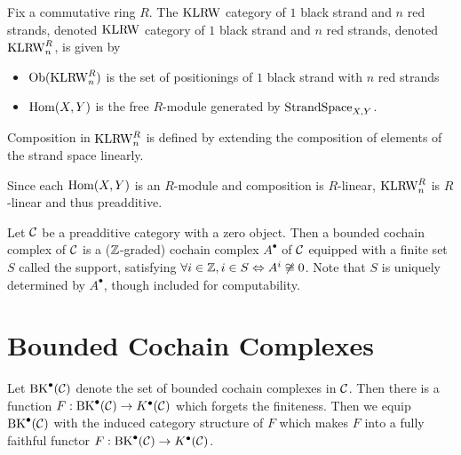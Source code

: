 \begin{definition}
  Fix a commutative ring $R$. The $\operatorname{KLRW}$ category of $1$ black strand
  and $n$ red strands, denoted $\operatorname{KLRW}$ category of $1$ black strand
  and $n$ red strands, denoted $\operatorname{KLRW}^R_n$, is given by
  \begin{itemize}
    \item $\operatorname{Ob}(\operatorname{KLRW}^R_n)$ is the set of positionings of $1$ black strand
    with $n$ red strands
    \item $\operatorname{Hom}(X, Y)$ is the free $R$-module generated by $\text{StrandSpace}_{X, Y}$.
  \end{itemize}
  Composition in $\operatorname{KLRW}^R_n$ is defined by extending the composition of elements of the strand
  space linearly.

  Since each $\operatorname{Hom}(X, Y)$ is an $R$-module and composition is $R$-linear, $\operatorname{KLRW}^R_n$
  is $R$-linear and thus preadditive.
\end{definition}
\begin{definition}
  Let $\mathcal{C}$ be a preadditive category with a zero object. Then a bounded cochain
  complex of $\mathcal{C}$ is a ($\mathbb{Z}$-graded) cochain complex $A^\bullet$ of $\mathcal{C}$ equipped with a finite set
  $S$ called the support, satisfying
  $\forall i\in \mathbb{Z}, i\in S \Leftrightarrow A^i\not\cong 0$. Note that
  $S$ is uniquely determined by $A^\bullet$, though included
  for computability.
\end{definition}

\section{Bounded Cochain Complexes}
\begin{definition}
  Let $\operatorname{BK}^\bullet(\mathcal{C})$ denote the set of bounded cochain complexes in $\mathcal{C}$. Then
  there is a function $F:\operatorname{BK}^\bullet(\mathcal{C})\to K^\bullet(\mathcal{C})$ which forgets the finiteness.
  Then we equip $\operatorname{BK}^\bullet(\mathcal{C})$ with the induced category structure of $F$ which makes
  $F$ into a fully faithful functor $F:\operatorname{BK}^\bullet(\mathcal{C}) \to K^\bullet (\mathcal{C})$.
\end{definition}


